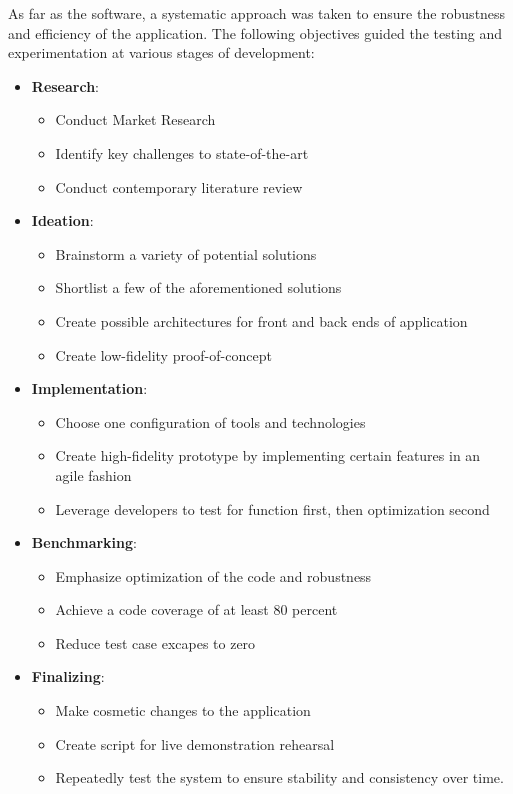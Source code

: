 As far as the software, a systematic approach was taken to ensure the
robustness and efficiency of the application.
The following objectives guided the testing and experimentation at various stages of development:

\begin{itemize}
    \item \textbf{Research}:
    \begin{itemize}
        \item Conduct Market Research
        \item Identify key challenges to state-of-the-art
        \item Conduct contemporary literature review
    \end{itemize}
    \item \textbf{Ideation}:
    \begin{itemize}
        \item Brainstorm a variety of potential solutions
        \item Shortlist a few of the aforementioned solutions
        \item Create possible architectures for front and back ends of application
        \item Create low-fidelity proof-of-concept
    \end{itemize}
    \item \textbf{Implementation}:
    \begin{itemize}
        \item Choose one configuration of tools and technologies
        \item Create high-fidelity prototype by implementing certain
        features in an agile fashion
        \item Leverage developers to test for function first,
        then optimization second
    \end{itemize}
    \item \textbf{Benchmarking}:
    \begin{itemize}
        \item Emphasize optimization of the code and robustness
        \item Achieve a code coverage of at least 80 percent
        \item Reduce test case excapes to zero
    \end{itemize}
    \item \textbf{Finalizing}:
    \begin{itemize}
        \item Make cosmetic changes to the application
        \item Create script for live demonstration rehearsal
        \item Repeatedly test the system to ensure stability and consistency over time.
    \end{itemize}
\end{itemize}

